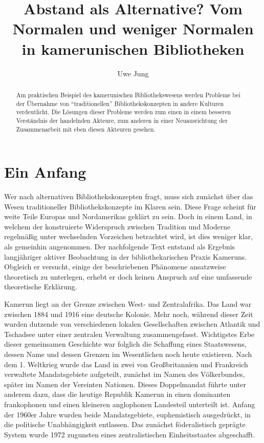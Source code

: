 \documentclass[a4paper,
fontsize=11pt,
oneside,
numbers=noperiodatend,
parskip=half-,
bibliography=totoc,
final
]{scrartcl}
\title{\LARGE{Abstand als Alternative? Vom Normalen und weniger Normalen in kamerunischen Bibliotheken}} %
\author{Uwe Jung} %
\date{}
\begin{document}
\maketitle
\thispagestyle{fancyplain} 

\begin{abstract}
Am praktischen Beispiel des kamerunischen Bibliothekswesens werden
Probleme bei der Übernahme von ``traditionellen'' Bibliothekskonzepten
in andere Kulturen verdeutlicht. Die Lösungen dieser Probleme werden zum
einen in einem besseren Verständnis der handelnden Akteure, zum anderen
in einer Neuausrichtung der Zusammenarbeit mit eben diesen Akteuren
gesehen.
\end{abstract}

\section*{Ein Anfang}\label{ein-anfang}

Wer nach alternativen Bibliothekskonzepten fragt, muss sich zunächst
über das Wesen traditioneller Bibliothekskonzepte im Klaren sein. Diese
Frage scheint für weite Teile Europas und Nordamerikas geklärt zu sein.
Doch in einem Land, in welchem der konstruierte Widerspruch zwischen
Tradition und Moderne regelmäßig unter wechselnden Vorzeichen betrachtet
wird, ist dies weniger klar, als gemeinhin angenommen. Der nachfolgende
Text entstand als Ergebnis langjähriger aktiver Beobachtung in der
bibliothekarischen Praxis Kameruns. Obgleich er versucht, einige der
beschriebenen Phänomene ansatzweise theoretisch zu unterlegen, erhebt er
doch keinen Anspruch auf eine umfassende theoretische Erklärung.

Kamerun liegt an der Grenze zwischen West- und Zentralafrika. Das Land
war zwischen 1884 und 1916 eine deutsche Kolonie. Mehr noch, während
dieser Zeit wurden dutzende von verschiedenen lokalen Gesellschaften
zwischen Atlantik und Tschadsee unter einer zentralen Verwaltung
zusammengefasst. Wichtigstes Erbe dieser gemeinsamen Geschichte war
folglich die Schaffung eines Staatswesens, dessen Name und dessen
Grenzen im Wesentlichen noch heute existieren. Nach dem 1. Weltkrieg
wurde das Land in zwei von Großbritannien und Frankreich verwaltete
Mandatsgebiete aufgeteilt, zunächst im Namen des Völkerbundes, später im
Namen der Vereinten Nationen. Dieses Doppelmandat führte unter anderem
dazu, dass die heutige Republik Kamerun in einen dominanten frankophonen
und einen kleineren anglophonen Landesteil unterteilt ist. Anfang der
1960er Jahre wurden beide Mandatsgebiete, euphemistisch ausgedrückt, in
die politische Unabhängigkeit entlassen. Das zunächst föderalistisch
geprägte System wurde 1972 zugunsten eines zentralistischen
Einheitsstaates abgeschafft.
\end{document}

